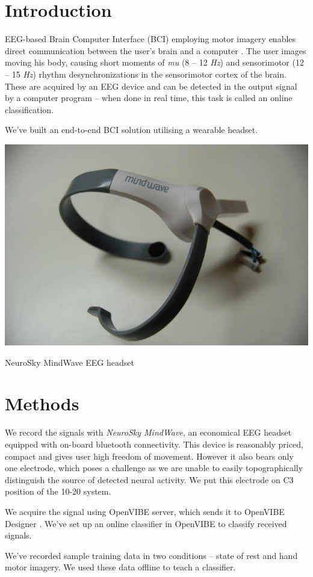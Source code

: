 \documentclass[a1,portrait]{sciposter}
\def\mysection#1{
{\color{sectionCol}\section*{\sc\bfseries #1}}}
\begin{document}
\begin{multicols*}{3}

\mysection{Introduction}

EEG-based Brain Computer Interface (BCI) employing motor imagery enables direct communication between the user's brain and a computer \cite{schlogl2005characterization}. The user images moving his body, causing short moments of \emph{mu} (8 – 12 \emph{Hz}) and sensorimotor (12 – 15 \emph{Hz}) rhythm desynchronizations in the sensorimotor cortex \cite{mcfarland2000mu} of the brain. These are acquired by an EEG device and can be detected in the output signal by a computer program -- when done in real time, this task is called an online classification.

We've built an end-to-end BCI solution utilising a wearable headset.

\includegraphics[width=\columnwidth]{mindwave}
\caption{NeuroSky MindWave EEG headset} 

\mysection{Methods}

We record the signals with \emph{NeuroSky MindWave}, an economical EEG headset equipped with on-board bluetooth connectivity. This device is reasonably priced, compact and gives user high freedom of movement. However it also bears only one electrode, which poses a challenge as we are unable to easily topographically distinguish the source of detected neural activity. We put this electrode on C3 position of the 10-20 system.

We acquire the signal using OpenVIBE server, which sends it to OpenVIBE Designer \cite{renard2010openvibe}. We've set up an online classifier in OpenVIBE to classify received signals.

We've recorded sample training data in two conditions -- state of rest and hand motor imagery. We used these data offline to teach a classifier.


\end{multicols*}
\end{document}

